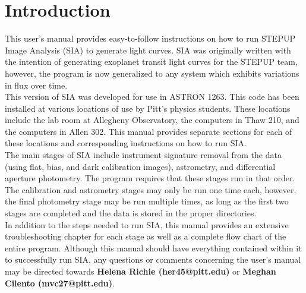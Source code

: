 \documentclass[11pt]{report}
\begin{document}
\tableofcontents
\chapter{Introduction}
\parindent0pt

This user's manual provides easy-to-follow instructions on how to run STEPUP Image Analysis (SIA) to generate light curves. SIA was originally written with the intention of generating exoplanet transit light curves for the STEPUP team, however, the program is now generalized to any system which exhibits variations in flux over time. \\

This version of SIA was developed for use in ASTRON 1263. This code has been installed at various locations of use by Pitt's physics students. These locations include the lab room at Allegheny Observatory, the computers in Thaw 210, and the computers in Allen 302. This manual provides separate sections for each of these locations and corresponding instructions on how to run SIA.\\

The main stages of SIA include instrument signature removal from the data (using flat, bias, and dark calibration images), astrometry, and differential aperture photometry. The program requires that these stages run in that order. The calibration and astrometry stages may only be run one time each, however, the final photometry stage may be run multiple times, as long as the first two stages are completed and the data is stored in the proper directories. \\

In addition to the steps needed to run SIA, this manual provides an extensive troubleshooting chapter for each stage as well as a complete flow chart of the entire program. Although this manual should have everything contained within it to successfully run SIA, any questions or comments concerning the user's manual may be directed towards \textbf{Helena Richie (her45@pitt.edu)} or \textbf{Meghan Cilento (mvc27@pitt.edu)}. 


\end{document}
